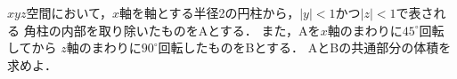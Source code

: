 \documentclass[../../main.tex]{subfiles}
\begin{document}
$xyz$空間において，$x$軸を軸とする半径2の円柱から，$|y|<1$かつ$|z|<1$で表される
角柱の内部を取り除いたものをAとする．
また，Aを$x$軸のまわりに${45}^\circ$回転してから
$z$軸のまわりに${90}^\circ$回転したものをBとする．
AとBの共通部分の体積を求めよ．
\end{document}
